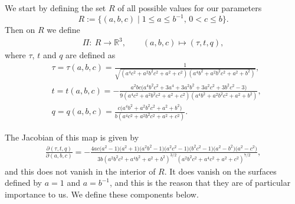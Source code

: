 \documentclass[pdftex]{sigma}
\numberwithin{equation}{section}
\begin{document}
 We start by defining the set $R$ of all possible values for our parameters
 \begin{equation} \label{eq:phasespaceabc}
 R := \bigl\{(a,b,c)\mid 1 \leq a \leq b^{-1},\, 0 < c \leq b\bigr\}.
 \end{equation}
 Then on $R$ we define
 \begin{align*}
 \Pi\colon \ R\longrightarrow \mathbb{R}^3, \qquad
 (a,b,c) \longmapsto (\tau,t,q),
 \end{align*}
 where
 $\tau$, $t$ and $q$ are defined as
 \begin{align*}
 &\tau= \tau(a,b,c) = \frac{1}{\sqrt{(a^4c^2 + a^2b^2c^2 + a^2 + c^2)(a^4b^2 + a^2b^2c^2 + a^2 + b^2)}}, \\
 &t= t(a,b,c) = -\frac{a^2bc\bigl(a^4b^2c^2 + 3a^4 + 3a^2b^2 + 3a^2c^2 + 3b^2c^2 - 3\bigr)}{9(a^4c^2 + a^2b^2c^2 + a^2 + c^2)(a^4b^2 + a^2b^2c^2 + a^2 + b^2)},\\
 &q= q(a,b,c) = \frac{c\bigl(a^4b^2 + a^2b^2c^2 + a^2 + b^2\bigr)}{b(a^4c^2 + a^2b^2c^2 + a^2 + c^2)}.
 \end{align*}

 The Jacobian of this map is given by
 \begin{gather}\label{eq:jacobian}
 \frac{\partial(\tau,t,q)}{\partial(a,b,c)} = -\frac{4ac\bigl(a^2-1\bigr)\bigl(a^2+1\bigr)\bigl(a^2b^2-1\bigr)\bigl(a^2c^2-1\bigr)\bigl(b^2c^2-1\bigr)\bigl(a^2-b^2\bigr)\bigl(a^2-c^2\bigr)}{3b(a^2b^2c^2 + a^4b^2+a^2+b^2)^{3/2}(a^2b^2c^2+a^4c^2 + a^2+c^2)^{7/2}},
 \end{gather}
and this does not vanish in the interior of $R$. It does vanish on the surfaces defined by $a=1$ and $a=b^{-1}$, and this is the reason that they are of particular importance to us. We define these components below.
\end{document}
